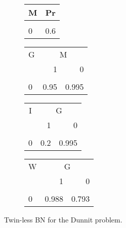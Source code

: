 \documentclass[10pt,]{scrartcl}
\begin{document}
\begin{figure}

\hspace{-0.8cm}\begin{subfigure}[!ht]{0.2\textwidth}
\begin{table}[H]
\centering
\begin{tabular}{lr}
\toprule
M & Pr\\
\midrule
\cellcolor{gray!6}{1} & \cellcolor{gray!6}{0.4}\\
0 & 0.6\\
\bottomrule
\end{tabular}
\end{table}

\begin{table}[H]
\centering
\begin{tabular}{lrr}
\toprule
\multicolumn{1}{c}{G} & \multicolumn{2}{c}{M} \\
  & 1 & 0\\
\midrule
\cellcolor{gray!6}{1} & \cellcolor{gray!6}{0.05} & \cellcolor{gray!6}{0.005}\\
0 & 0.95 & 0.995\\
\bottomrule
\end{tabular}
\end{table}
\end{subfigure}  
 \hspace{0.5cm}\begin{subfigure}[!ht]{0.2\textwidth}
\begin{table}[H]
\centering
\begin{tabular}{lrr}
\toprule
\multicolumn{1}{c}{I} & \multicolumn{2}{c}{G} \\
  & 1 & 0\\
\midrule
\cellcolor{gray!6}{1} & \cellcolor{gray!6}{0.8} & \cellcolor{gray!6}{0.005}\\
0 & 0.2 & 0.995\\
\bottomrule
\end{tabular}
\end{table}

\begin{table}[H]
\centering
\begin{tabular}{lrr}
\toprule
\multicolumn{1}{c}{W} & \multicolumn{2}{c}{G} \\
  & 1 & 0\\
\midrule
\cellcolor{gray!6}{1} & \cellcolor{gray!6}{0.012} & \cellcolor{gray!6}{0.207}\\
0 & 0.988 & 0.793\\
\bottomrule
\end{tabular}
\end{table}
\end{subfigure}
\caption{Twin-less BN for the \textsf{Dunnit} problem.}
\label{fig:twinless}
\end{figure}
\end{document}
